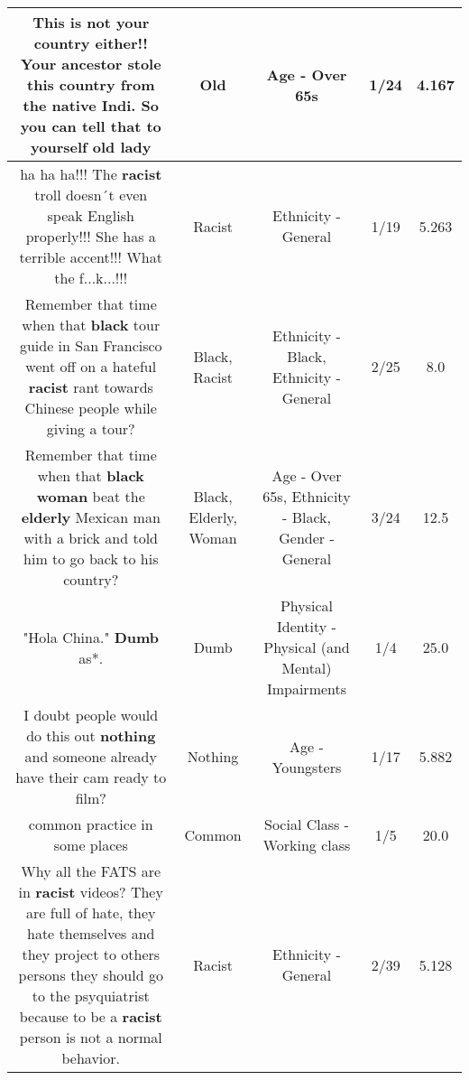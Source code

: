\documentclass[11pt]{article}
\newlength\mylength
\begin{document}
\begin{center}
\begin{longtable}{|C{.65\mylength}|C{.30\mylength}|C{.12\mylength}|C{.12\mylength}|C{.12\mylength}|}
  \small This is not your country either!! Your ancestor stole this country from the native Indi. So you can tell that to yourself \textbf{old} lady\normalsize   & Old & Age - Over 65s & 1/24 & 4.167 \\  \hline
  \small ha ha ha!!! The \textbf{racist} troll doesn´t even speak English properly!!! She has a terrible accent!!! What the f...k...!!!\normalsize   & Racist & Ethnicity - General & 1/19 & 5.263 \\  \hline
  \small Remember that time when that \textbf{black} tour guide in San Francisco went off on a hateful \textbf{racist} rant towards Chinese people while giving a tour?\normalsize   & Black, Racist & Ethnicity - Black, Ethnicity - General & 2/25 & 8.0 \\  \hline
  \small Remember that time when that \textbf{black} \textbf{woman} beat the \textbf{elderly} Mexican man with a brick and told him to go back to his country?\normalsize   & Black, Elderly, Woman & Age - Over 65s, Ethnicity - Black, Gender - General & 3/24 & 12.5 \\  \hline
  \small "Hola China." \textbf{Dumb} as*.\normalsize   & Dumb & Physical Identity - Physical (and Mental) Impairments & 1/4 & 25.0 \\  \hline
  \small I doubt people would do this out \textbf{nothing} and someone already have their cam ready to film?\normalsize   & Nothing & Age - Youngsters & 1/17 & 5.882 \\  \hline
  \small common practice in some places\normalsize   & Common & Social Class - Working class & 1/5 & 20.0 \\  \hline
  \small Why all the FATS are in \textbf{racist} videos? They are full of hate, they hate themselves and they project to others persons they should go to the psyquiatrist because to be a \textbf{racist} person is not a normal behavior.\normalsize   & Racist & Ethnicity - General & 2/39 & 5.128 \\  \hline

\end{longtable}
\end{center}
\end{document}
